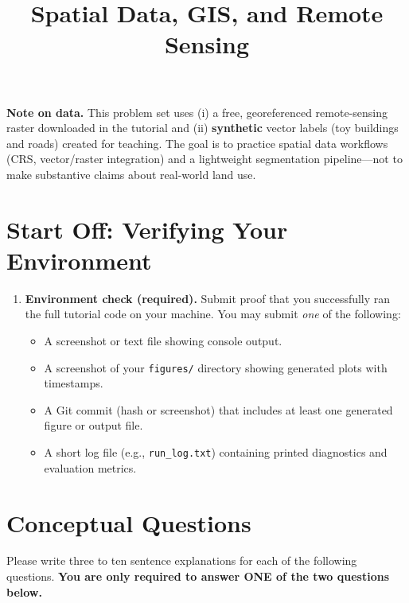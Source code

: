 \documentclass[11pt]{article}
\title{ Spatial Data, GIS, and Remote Sensing}
\author{ }
\date{ }
\begin{document}
\maketitle

\noindent \textbf{Note on data.} This problem set uses (i) a free, georeferenced remote-sensing raster downloaded in the tutorial and (ii) \textbf{synthetic} vector labels (toy buildings and roads) created for teaching. The goal is to practice spatial data workflows (CRS, vector/raster integration) and a lightweight segmentation pipeline---not to make substantive claims about real-world land use.

\section*{Start Off: Verifying Your Environment}

\begin{enumerate}
\item \textbf{Environment check (required).}  
Submit proof that you successfully ran the full tutorial code on your machine. You may submit \emph{one} of the following:
\begin{itemize}
  \item A screenshot or text file showing console output.
  \item A screenshot of your \texttt{figures/} directory showing generated plots with timestamps.
  \item A Git commit (hash or screenshot) that includes at least one generated figure or output file.
  \item A short log file (e.g., \texttt{run\_log.txt}) containing printed diagnostics and evaluation metrics.
\end{itemize}
\end{enumerate}

\section*{Conceptual Questions}
Please write three to ten sentence explanations for each of the following questions. \textbf{You are only required to answer ONE of the two questions below.} \bigskip
 
\end{document}
